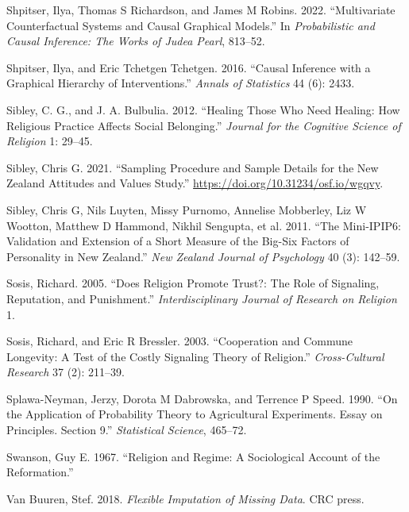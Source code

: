 \documentclass[
  single column]{article}
\newlength{\cslhangindent}
\newenvironment{CSLReferences}[2] %
 {\begin{list}{}{%
  \setlength{\itemindent}{0pt}
  \setlength{\leftmargin}{0pt}
  \setlength{\parsep}{0pt}
  \ifodd #1
   \setlength{\leftmargin}{\cslhangindent}
   \setlength{\itemindent}{-1\cslhangindent}
  \fi
  \setlength{\itemsep}{#2\baselineskip}}}
 {\end{list}}
\begin{document}
\begin{CSLReferences}{1}{0}
Shpitser, Ilya, Thomas S Richardson, and James M Robins. 2022.
{``Multivariate Counterfactual Systems and Causal Graphical Models.''}
In \emph{Probabilistic and Causal Inference: The Works of {J}udea
{P}earl}, 813--52.

Shpitser, Ilya, and Eric Tchetgen Tchetgen. 2016. {``Causal Inference
with a Graphical Hierarchy of Interventions.''} \emph{Annals of
Statistics} 44 (6): 2433.

Sibley, C. G., and J. A. Bulbulia. 2012. {``Healing Those Who Need
Healing: How Religious Practice Affects Social Belonging.''}
\emph{Journal for the Cognitive Science of Religion} 1: 29--45.

Sibley, Chris G. 2021. {``Sampling Procedure and Sample Details for the
New Zealand Attitudes and Values Study.''}
\url{https://doi.org/10.31234/osf.io/wgqvy}.

Sibley, Chris G, Nils Luyten, Missy Purnomo, Annelise Mobberley, Liz W
Wootton, Matthew D Hammond, Nikhil Sengupta, et al. 2011. {``The
Mini-IPIP6: Validation and Extension of a Short Measure of the Big-Six
Factors of Personality in New Zealand.''} \emph{New Zealand Journal of
Psychology} 40 (3): 142--59.

Sosis, Richard. 2005. {``Does Religion Promote Trust?: The Role of
Signaling, Reputation, and Punishment.''} \emph{Interdisciplinary
Journal of Research on Religion} 1.

Sosis, Richard, and Eric R Bressler. 2003. {``Cooperation and Commune
Longevity: A Test of the Costly Signaling Theory of Religion.''}
\emph{Cross-Cultural Research} 37 (2): 211--39.

Splawa-Neyman, Jerzy, Dorota M Dabrowska, and Terrence P Speed. 1990.
{``On the Application of Probability Theory to Agricultural Experiments.
Essay on Principles. Section 9.''} \emph{Statistical Science}, 465--72.

Swanson, Guy E. 1967. {``Religion and Regime: A Sociological Account of
the {R}eformation.''}

Van Buuren, Stef. 2018. \emph{Flexible Imputation of Missing Data}. CRC
press.


\end{CSLReferences}
\end{document}
